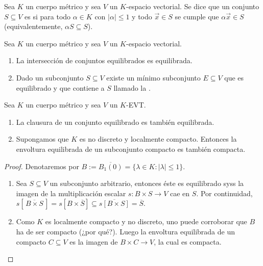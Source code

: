 \documentclass[topologia-analisis.tex]{subfiles}
\begin{document}
\begin{mydef}
	Sea $K$ un cuerpo métrico y sea $V$ un $K$-espacio vectorial.
	Se dice que un conjunto $S \subseteq V$ es  si para todo $\alpha \in K$
	con $|\alpha| \le 1$ y todo $\vec x \in S$ se cumple que $\alpha \vec x \in S$ (equivalentemente, $\alpha S \subseteq S$).
\end{mydef}
\begin{lem}
	Sea $K$ un cuerpo métrico y sea $V$ un $K$-espacio vectorial.
	\begin{enumerate}
		\item La intersección de conjuntos equilibrados es equilibrada.
		\item Dado un subconjunto $S \subseteq V$ existe un mínimo subconjunto $E \subseteq V$ que es equilibrado
			y que contiene a $S$ llamado la .
	\end{enumerate}
\end{lem}
\begin{prop}
	Sea $K$ un cuerpo métrico y sea $V$ un $K$-EVT.
	\begin{enumerate}
		\item La clausura de un conjunto equilibrado es también equilibrada.
		\item Supongamos que $K$ es no discreto y localmente compacto.
			Entonces la envoltura equilibrada de un subconjunto compacto es también compacta.
	\end{enumerate}
\end{prop}
\begin{proof}
	Denotaremos por $B := \overline{B_1(0)} = \{ \lambda \in K : |\lambda| \le 1 \}$.
	\begin{enumerate}
		\item Sea $S \subseteq V$ un subconjunto arbitrario,
			entonces éste es equilibrado syss la imagen de la multiplicación escalar $s\colon B \times S \to V$ cae en $S$.
			Por continuidad, $s[ \,\overline{B \times S}\, ] = s[ B\times \overline{S} ] \subseteq \overline{s[B \times S]} = \overline{S}$.
		\item Como $K$ es localmente compacto y no discreto, uno puede corroborar que $B$ ha de ser compacto (¿por qué?).
			Luego la envoltura equilibrada de un compacto $C \subseteq V$ es la imagen de $B \times C \to V$,
			la cual es compacta. \qedhere
	\end{enumerate}
\end{proof}
\end{document}
